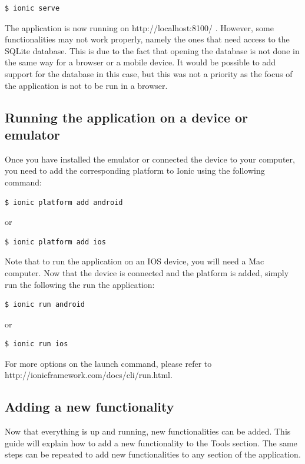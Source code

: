 \documentclass{eplmastersthesis}
\begin{document}
\begin{lstlisting}[language=bash]
   $ ionic serve
\end{lstlisting} 
The application is now running on http://localhost:8100/ . However, some functionalities may not work properly, namely the ones that need access to the SQLite database. This is due to the fact that opening the database is not done in the same way for a browser or a mobile device. It would be possible to add support for the database in this case, but this was not a priority as the focus of the application is not to be run in a browser.
\subsection{Running the application on a device or emulator}
Once you have installed the emulator or connected the device to your computer, you need to add the corresponding platform to Ionic using the following command:
\begin{lstlisting}[language=bash]
   $ ionic platform add android
\end{lstlisting} 

or

\begin{lstlisting}[language=bash]
   $ ionic platform add ios
\end{lstlisting} 
Note that to run the application on an IOS device, you will need a Mac computer. Now that the device is connected and the platform is added, simply run the following the run the application:
\begin{lstlisting}[language=bash]
   $ ionic run android
\end{lstlisting} 

or 

\begin{lstlisting}[language=bash]
   $ ionic run ios
\end{lstlisting} 
For more options on the launch command, please refer to http://ionicframework.com/docs/cli/run.html.
\subsection{Adding a new functionality}
Now that everything is up and running, new functionalities can be added. This guide will explain how to add a new functionality to the Tools section. The same steps can be repeated to add new functionalities to any section of the application.
\end{document}
